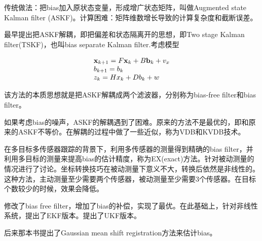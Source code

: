 \documentclass[UTF8]{ctexart} %
\begin{document}
\section{}
传统做法：把bias加入原状态变量，形成增广状态矩阵，叫做Augmented state Kalman filter (ASKF)。计算困难：矩阵维数增长导致的计算复杂度和截断误差。

\cite{friedlandTreatmentBiasRecursive1969}最早提出把ASKF解耦，即把偏差和状态隔离开的思想，即Two stage Kalman filter(TSKF)，也叫bias separate Kalman filter.考虑模型

\[\begin{array}{l}
{{\bf{x}}_{k + 1}} = F{{\bf{x}}_k} + B{{\bf{b}}_k} + {v_x}\\
{b_{k + 1}} = {b_k}\\
{z_k} = H{x_k} + D{b_k} + w
\end{array}\]	  	

该方法的本质思想就是把ASKF解耦成两个滤波器，分别称为bias-free filter和bias filter。

如果考虑bias的噪声，ASKF的解耦遇到了困难。原来的方法不是最优的，即和原来的ASKF不等价。在解耦的过程中做了一些近似，称为VDB和KVDB技术。 %

在多目标多传感器跟踪的背景下，\cite{xiangdonglinExactMultisensorDynamic004}利用多传感器的测量得到精确的bias filter，并利用多目标的测量来提高bias的估计精度，称为EX(exact)方法。\cite{taghaviMultisensorMultitargetBearing2016}针对被动测量的情况进行了讨论。坐标转换技巧在被动测量下意义不大，转换后依然是非线性的。这种方法，主动测量至少需要两个传感器，被动测量至少需要3个传感器。在目标个数较少的时候，效果会降低。

\cite{chien-shuhsiehOptimalSolutionTwostage1999}修改了bias free filter，增加了bias的补偿，实现了最优。在此基础上，\cite{chenNovelTwostageExtended2016}针对非线性系统，提出了EKF版本。\cite{wufanJiYuATSUKFSuanFaDeWeiXingZiKongXiTongGuZhangGuJi2018}提出了UKF版本。

后来那本书提出了Gaussian mean shift registration方法来估计bias。

\equiv
\end{document}
